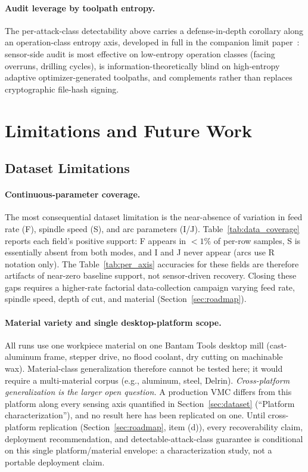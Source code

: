 \documentclass[sensors,article,submit,moreauthors,pdftex]{Definitions/mdpi}
\begin{document}
\paragraph{Audit leverage by toolpath entropy.} The per-attack-class detectability above carries a defense-in-depth corollary along an operation-class entropy axis, developed in full in the companion limit paper~\cite{paperB_entropy}: sensor-side audit is most effective on low-entropy operation classes (facing overruns, drilling cycles), is information-theoretically blind on high-entropy adaptive optimizer-generated toolpaths, and complements rather than replaces cryptographic file-hash signing.

\section{Limitations and Future Work}
\label{sec:future}

\subsection{Dataset Limitations}
\label{sec:lim-dataset}

\paragraph{Continuous-parameter coverage.} The most consequential dataset limitation is the near-absence of variation in feed rate (F), spindle speed (S), and arc parameters (I/J). Table~\ref{tab:data_coverage} reports each field's positive support: F appears in $<\!1\%$ of per-row samples, S is essentially absent from both modes, and I and J never appear (arcs use R notation only). The Table~\ref{tab:per_axis} accuracies for these fields are therefore artifacts of near-zero baseline support, not sensor-driven recovery. Closing these gaps requires a higher-rate factorial data-collection campaign varying feed rate, spindle speed, depth of cut, and material (Section~\ref{sec:roadmap}).

\paragraph{Material variety and single desktop-platform scope.} All runs use one workpiece material on one Bantam Tools desktop mill (cast-aluminum frame, stepper drive, no flood coolant, dry cutting on machinable wax). Material-class generalization therefore cannot be tested here; it would require a multi-material corpus (e.g., aluminum, steel, Delrin). \emph{Cross-platform generalization is the larger open question.} A production VMC differs from this platform along every sensing axis quantified in Section~\ref{sec:dataset} (``Platform characterization''), and no result here has been replicated on one. Until cross-platform replication (Section~\ref{sec:roadmap}, item (d)), every recoverability claim, deployment recommendation, and detectable-attack-class guarantee is conditional on this single platform/material envelope: a characterization study, not a portable deployment claim.
\end{document}
